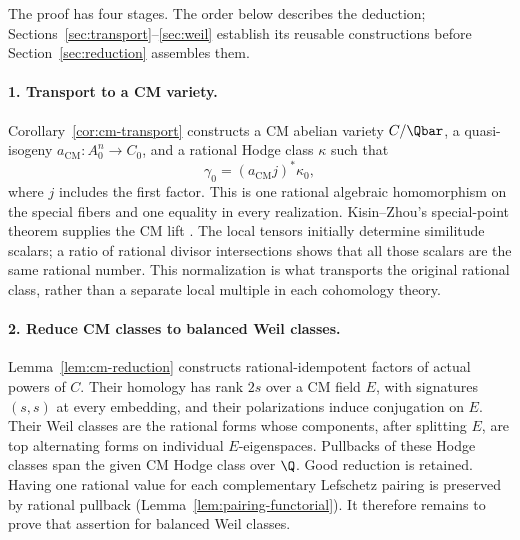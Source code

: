 The proof has four stages. The order below describes the deduction;
Sections~\ref{sec:transport}--\ref{sec:weil} establish its reusable
constructions before Section~\ref{sec:reduction} assembles them.

\paragraph{1. Transport to a CM variety.}
Corollary~\ref{cor:cm-transport} constructs a CM
abelian variety \(C/\Qbar\), a quasi-isogeny
\(a_{\mathrm{CM}}:A_0^n\to C_0\), and a rational Hodge class
\(\kappa\) such that
\[
 \gamma_0=(a_{\mathrm{CM}}j)^*\kappa_0,
\]
where \(j\) includes the first factor. This is one rational algebraic homomorphism on the
special fibers and one equality in every realization. Kisin--Zhou's
special-point theorem supplies the CM lift
\cite[Theorem~2.2.7]{KisinZhou2025}. The local tensors initially determine
similitude scalars; a ratio of rational divisor intersections shows
that all those scalars are the same rational number. This normalization
is what transports the original rational class, rather than a separate
local multiple in each cohomology theory.

\paragraph{2. Reduce CM classes to balanced Weil classes.}
Lemma~\ref{lem:cm-reduction} constructs rational-idempotent factors of
actual powers of \(C\). Their homology has rank \(2s\) over a CM field
\(E\), with signatures \((s,s)\) at every embedding, and their
polarizations induce conjugation on \(E\). Their Weil classes are the
rational forms whose components, after splitting \(E\), are top
alternating forms on individual \(E\)-eigenspaces. Pullbacks of these
Hodge classes span the given CM Hodge class over \(\Q\). Good reduction
is retained. Having one rational value for each complementary
Lefschetz pairing is preserved by rational pullback
(Lemma~\ref{lem:pairing-functorial}). It therefore remains to prove
that assertion for balanced Weil classes.

